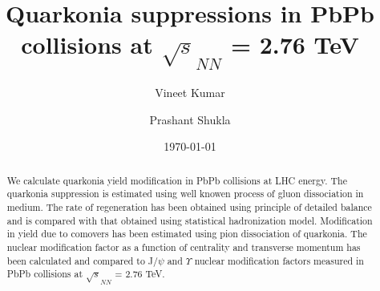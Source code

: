 \documentclass[aps,prc,preprint,superscriptaddress,showpacs,showkeys]{revtex4-1}
\begin{document}
\title{{\Large Quarkonia suppressions in PbPb collisions at $\sqrt s_{NN}$ =  2.76 TeV }}
\author{\large Vineet Kumar}
\author{\large Prashant Shukla}
\date{\today}


\begin{abstract}
We calculate quarkonia yield modification in PbPb collisions at LHC energy.
The quarkonia suppression is estimated using well knowen 
process of gluon dissociation in medium. The rate of regeneration has been obtained 
using principle of detailed balance and is compared with that obtained using statistical hadronization 
model. Modification in yield due to comovers has been estimated using pion dissociation of quarkonia.  
  The nuclear modification factor as a function of centrality and transverse momentum has been calculated  
and compared to J/$\psi$ and $\Upsilon$ nuclear modification factors measured in PbPb collisions 
at $\sqrt s_{NN}$ =  2.76 TeV.
\end{abstract}

\maketitle
\end{document}
